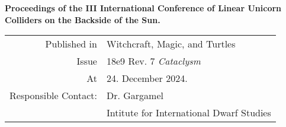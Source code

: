 
\begin{center}\RobotoSlab\vspace*{10mm}

\huge \textbf{\Title}\vspace{12mm}

\Large        \Author






\large \textbf{Proceedings of the III International Conference of Linear Unicorn Colliders on the Backside of the Sun.}\vspace{10mm}


\small
\begin{tabular}{rl}
     Published in & \large Witchcraft, Magic, and Turtles \\[2mm]
            Issue & \large 18e9 Rev. 7 \emph{Cataclysm} \\[2mm]
               At & \large 24. December 2024.\\[10mm]
   Responsible Contact: & \large Dr. Gargamel \\[1mm]
                  & Intitute for International Dwarf Studies
\end{tabular}


\end{center}

\thispagestyle{empty}
\cleardoublepage

\setlength{\topmargin}{0mm}
\normalsize%
